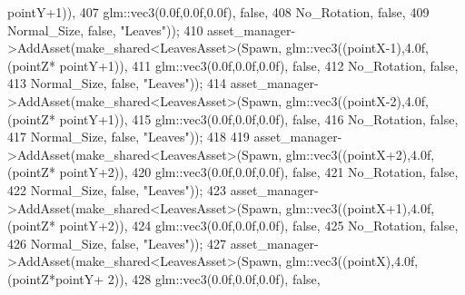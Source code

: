 \begin{DoxyCode}
      pointY+1)),
407                                                              glm::vec3(0.0f,0.0f,0.0f), \textcolor{keyword}{false},
408                                                              No\_Rotation, \textcolor{keyword}{false},
409                                                              Normal\_Size, \textcolor{keyword}{false}, \textcolor{stringliteral}{"Leaves"}));
410             asset\_manager->AddAsset(make\_shared<LeavesAsset>(Spawn, glm::vec3((pointX-1),4.0f,(pointZ*
      pointY+1)),
411                                                              glm::vec3(0.0f,0.0f,0.0f), \textcolor{keyword}{false},
412                                                              No\_Rotation, \textcolor{keyword}{false},
413                                                              Normal\_Size, \textcolor{keyword}{false}, \textcolor{stringliteral}{"Leaves"}));
414             asset\_manager->AddAsset(make\_shared<LeavesAsset>(Spawn, glm::vec3((pointX-2),4.0f,(pointZ*
      pointY+1)),
415                                                              glm::vec3(0.0f,0.0f,0.0f), \textcolor{keyword}{false},
416                                                              No\_Rotation, \textcolor{keyword}{false},
417                                                              Normal\_Size, \textcolor{keyword}{false}, \textcolor{stringliteral}{"Leaves"}));
418 
419             asset\_manager->AddAsset(make\_shared<LeavesAsset>(Spawn, glm::vec3((pointX+2),4.0f,(pointZ*
      pointY+2)),
420                                                              glm::vec3(0.0f,0.0f,0.0f), \textcolor{keyword}{false},
421                                                              No\_Rotation, \textcolor{keyword}{false},
422                                                              Normal\_Size, \textcolor{keyword}{false}, \textcolor{stringliteral}{"Leaves"}));
423             asset\_manager->AddAsset(make\_shared<LeavesAsset>(Spawn, glm::vec3((pointX+1),4.0f,(pointZ*
      pointY+2)),
424                                                              glm::vec3(0.0f,0.0f,0.0f), \textcolor{keyword}{false},
425                                                              No\_Rotation, \textcolor{keyword}{false},
426                                                              Normal\_Size, \textcolor{keyword}{false}, \textcolor{stringliteral}{"Leaves"}));
427             asset\_manager->AddAsset(make\_shared<LeavesAsset>(Spawn, glm::vec3((pointX),4.0f,(pointZ*pointY+
      2)),  
428                                                              glm::vec3(0.0f,0.0f,0.0f), \textcolor{keyword}{false},

\end{DoxyCode}
